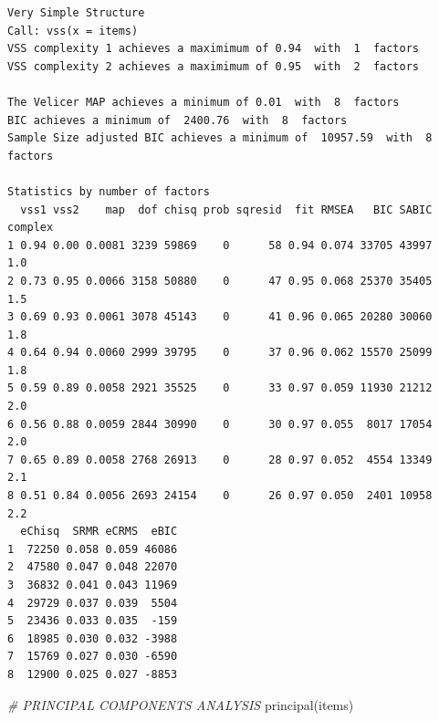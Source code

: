 \documentclass[
]{report}
\newenvironment{Shaded}{\begin{snugshade}}{\end{snugshade}}
\newcommand{\CommentTok}[1]{\textcolor[rgb]{0.56,0.35,0.01}{\textit{#1}}}
\newcommand{\FunctionTok}[1]{\textcolor[rgb]{0.00,0.00,0.00}{#1}}
\newcommand{\NormalTok}[1]{#1}
\begin{document}
\begin{verbatim}
Very Simple Structure
Call: vss(x = items)
VSS complexity 1 achieves a maximimum of 0.94  with  1  factors
VSS complexity 2 achieves a maximimum of 0.95  with  2  factors

The Velicer MAP achieves a minimum of 0.01  with  8  factors 
BIC achieves a minimum of  2400.76  with  8  factors
Sample Size adjusted BIC achieves a minimum of  10957.59  with  8  factors

Statistics by number of factors 
  vss1 vss2    map  dof chisq prob sqresid  fit RMSEA   BIC SABIC complex
1 0.94 0.00 0.0081 3239 59869    0      58 0.94 0.074 33705 43997     1.0
2 0.73 0.95 0.0066 3158 50880    0      47 0.95 0.068 25370 35405     1.5
3 0.69 0.93 0.0061 3078 45143    0      41 0.96 0.065 20280 30060     1.8
4 0.64 0.94 0.0060 2999 39795    0      37 0.96 0.062 15570 25099     1.8
5 0.59 0.89 0.0058 2921 35525    0      33 0.97 0.059 11930 21212     2.0
6 0.56 0.88 0.0059 2844 30990    0      30 0.97 0.055  8017 17054     2.0
7 0.65 0.89 0.0058 2768 26913    0      28 0.97 0.052  4554 13349     2.1
8 0.51 0.84 0.0056 2693 24154    0      26 0.97 0.050  2401 10958     2.2
  eChisq  SRMR eCRMS  eBIC
1  72250 0.058 0.059 46086
2  47580 0.047 0.048 22070
3  36832 0.041 0.043 11969
4  29729 0.037 0.039  5504
5  23436 0.033 0.035  -159
6  18985 0.030 0.032 -3988
7  15769 0.027 0.030 -6590
8  12900 0.025 0.027 -8853
\end{verbatim}

\begin{Shaded}
\begin{Highlighting}[]
\CommentTok{\# PRINCIPAL COMPONENTS ANALYSIS}
\FunctionTok{principal}\NormalTok{(items)}
\end{Highlighting}
\end{Shaded}
\end{document}

